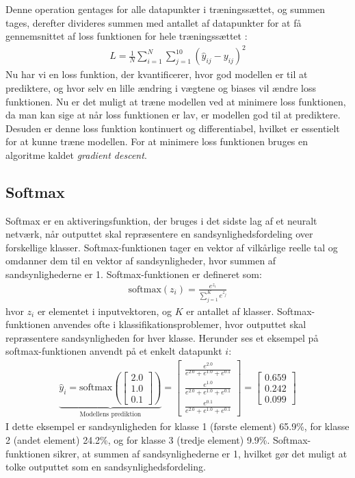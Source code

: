 \documentclass{article}
\begin{document}
Denne operation gentages for alle datapunkter i træningssættet, og summen tages, derefter divideres summen med antallet af datapunkter for at få gennemsnittet af loss funktionen for hele træningssættet \parencite{Sanderson_2017}:
\begin{align}
  L = \frac{1}{N} \sum_{i=1}^{N} \sum_{j=1}^{10} (\hat{y}_{ij} - y_{ij})^2
\end{align}
Nu har vi en loss funktion, der kvantificerer, hvor god modellen er til at prediktere, og hvor selv en lille ændring i vægtene og biases vil ændre loss funktionen. Nu er det muligt at træne modellen ved at minimere loss funktionen, da man kan sige at når loss funktionen er lav, er modellen god til at prediktere. Desuden er denne loss funktion kontinuert og differentiabel, hvilket er essentielt for at kunne træne modellen. For at minimere loss funktionen bruges en algoritme kaldet \textit{gradient descent}.

\subsection{Softmax}
Softmax er en aktiveringsfunktion, der bruges i det sidste lag af et neuralt netværk, når outputtet skal repræsentere en sandsynlighedsfordeling over forskellige klasser. Softmax-funktionen tager en vektor af vilkårlige reelle tal og omdanner dem til en vektor af sandsynligheder, hvor summen af sandsynlighederne er 1. Softmax-funktionen er defineret som:
\begin{align}
  \text{softmax}(z_i) = \frac{e^{z_i}}{\sum_{j=1}^{K} e^{z_j}}
\end{align}
hvor $z_i$ er elementet i inputvektoren, og $K$ er antallet af klasser. Softmax-funktionen anvendes ofte i klassifikationsproblemer, hvor outputtet skal repræsentere sandsynligheden for hver klasse. Herunder ses et eksempel på softmax-funktionen anvendt på et enkelt datapunkt $i$:
\begin{align}
  \underbrace{\hat{y}_i = \text{softmax}\left(\begin{bmatrix}
    2.0 \\
    1.0 \\
    0.1
  \end{bmatrix}\right)}_{\text{Modellens prediktion}}
  = \begin{bmatrix}
    \frac{e^{2.0}}{e^{2.0} + e^{1.0} + e^{0.1}} \\
    \frac{e^{1.0}}{e^{2.0} + e^{1.0} + e^{0.1}} \\
    \frac{e^{0.1}}{e^{2.0} + e^{1.0} + e^{0.1}}
  \end{bmatrix}
  = \begin{bmatrix}
    0.659 \\
    0.242 \\
    0.099
  \end{bmatrix}
\end{align}
I dette eksempel er sandsynligheden for klasse 1 (første element) 65.9\%, for klasse 2 (andet element) 24.2\%, og for klasse 3 (tredje element) 9.9\%. Softmax-funktionen sikrer, at summen af sandsynlighederne er 1, hvilket gør det muligt at tolke outputtet som en sandsynlighedsfordeling. \parencite{Sanderson_2017}
\end{document}
